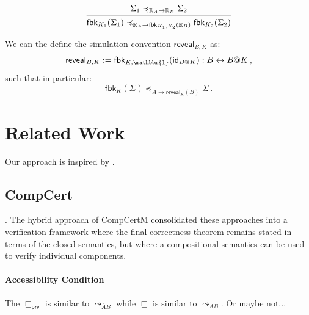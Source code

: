 \documentclass[acmsmall,screen,review,anonymous]{acmart}
\newcommand{\kw}[1]{\ensuremath{ \mathsf{#1} }}
\renewcommand{\preceq}{\preccurlyeq}
\begin{document}
\begin{lemma}
\[
  \begin{prooftree}
    \hypo{\Sigma_1 \preceq_{\mathbb{R}_A \rightarrow \mathbb{R}_B} \Sigma_2}
    \infer1{
      \kw{fbk}_{K_1}(\Sigma_1)
      \preceq_{\mathbb{R}_A \rightarrow \kw{fbk}_{K_1, K_2}(\mathbb{R}_B)}
      \kw{fbk}_{K_2}(\Sigma_2)}
  \end{prooftree}
\]
\end{lemma}

We can the define the simulation convention $\kw{reveal}_{B,K}$ as:
\[
  \kw{reveal}_{B,K} := \kw{fbk}_{K,\mathbbm{1}}(\kw{id}_{B@K}) : B \leftrightarrow B@K
  \,,
\]
such that in particular:
\[
  \kw{fbk}_K(\Sigma)
  \preceq_{A \rightarrow \kw{reveal}_K(B)}
  \Sigma
  \,.
\]



\section{Related Work} %

Our approach is inspired by \citet{feedback,caots}.

\subsection{CompCert} \label{sec:related:compcert}

\cite{sepcompcert}.
The hybrid approach of CompCertM
\cite{compcertm}
consolidated these approaches
into a verification framework
where the final correctness theorem
remains stated in terms of the closed semantics,
but where a compositional semantics
can be used to verify individual components.

\paragraph{Accessibility Condition}

The $\sqsubseteq_{\kw{prv}}$ is similar to $\leadsto_{\bar{A}B}$
while $\sqsubseteq$ is similar to $\leadsto_{AB}$. Or maybe not...
\end{document}
